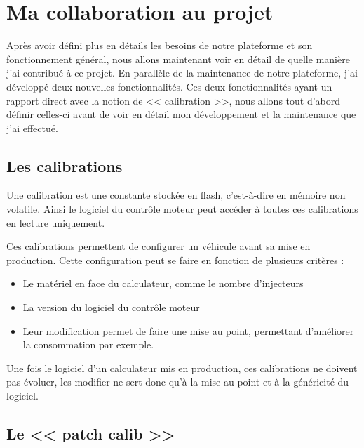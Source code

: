 \chapter{Ma collaboration au projet}\label{collab}
\putminitoc
Après avoir défini plus en détails les besoins de notre plateforme et son fonctionnement général, nous allons maintenant voir en détail de quelle manière j'ai contribué à ce projet. En parallèle de la maintenance de notre plateforme, j'ai développé deux nouvelles fonctionnalités. Ces deux fonctionnalités ayant un rapport direct avec la notion de << calibration >>, nous allons tout d'abord définir celles-ci avant de voir en détail mon développement et la maintenance que j'ai effectué.

\section{Les calibrations}
Une calibration est une constante stockée en flash, c'est-à-dire en mémoire non volatile. Ainsi le logiciel du contrôle moteur peut accéder à toutes ces calibrations en lecture uniquement.

Ces calibrations permettent de configurer un véhicule avant sa mise en production. Cette configuration peut se faire en fonction de plusieurs critères : 
\begin{itemize}
	\item Le matériel en face du calculateur, comme le nombre d'injecteurs
	\item La version du logiciel du contrôle moteur
	\item Leur modification permet de faire une mise au point, permettant d'améliorer la consommation par exemple.
\end{itemize}

Une fois le logiciel d'un calculateur mis en production, ces calibrations ne doivent pas évoluer, les modifier ne sert donc qu'à la mise au point et à la généricité du logiciel.
\vfill
\section{Le << patch calib >>}\label{patch}
%
